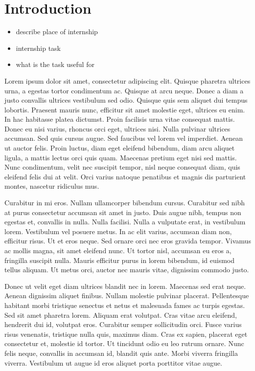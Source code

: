 \documentclass[../00_main.tex]{subfiles}
\begin{document}
\section{Introduction}

\begin{itemize}
    \item describe place of internship
    \item internship task
    \item what is the task useful for
\end{itemize}

Lorem ipsum dolor sit amet, consectetur adipiscing elit. Quisque pharetra ultrices urna, a egestas tortor condimentum ac. Quisque at arcu neque. Donec a diam a justo convallis ultrices vestibulum sed odio. Quisque quis sem aliquet dui tempus lobortis. Praesent mauris nunc, efficitur sit amet molestie eget, ultrices eu enim. In hac habitasse platea dictumst. Proin facilisis urna vitae consequat mattis. Donec eu nisi varius, rhoncus orci eget, ultrices nisi. Nulla pulvinar ultrices accumsan. Sed quis cursus augue. Sed faucibus vel lorem vel imperdiet. Aenean ut auctor felis. Proin luctus, diam eget eleifend bibendum, diam arcu aliquet ligula, a mattis lectus orci quis quam. Maecenas pretium eget nisi sed mattis. Nunc condimentum, velit nec suscipit tempor, nisl neque consequat diam, quis eleifend felis dui at velit. Orci varius natoque penatibus et magnis dis parturient montes, nascetur ridiculus mus.

Curabitur in mi eros. Nullam ullamcorper bibendum cursus. Curabitur sed nibh at purus consectetur accumsan sit amet in justo. Duis augue nibh, tempus non egestas et, convallis in nulla. Nulla facilisi. Nulla a vulputate erat, in vestibulum lorem. Vestibulum vel posuere metus. In ac elit varius, accumsan diam non, efficitur risus. Ut et eros neque. Sed ornare orci nec eros gravida tempor. Vivamus ac mollis magna, sit amet eleifend nunc. Ut tortor nisl, accumsan eu eros a, fringilla suscipit nulla. Mauris efficitur purus in lorem bibendum, id euismod tellus aliquam. Ut metus orci, auctor nec mauris vitae, dignissim commodo justo.

Donec ut velit eget diam ultrices blandit nec in lorem. Maecenas sed erat neque. Aenean dignissim aliquet finibus. Nullam molestie pulvinar placerat. Pellentesque habitant morbi tristique senectus et netus et malesuada fames ac turpis egestas. Sed sit amet pharetra lorem. Aliquam erat volutpat. Cras vitae arcu eleifend, hendrerit dui id, volutpat eros. Curabitur semper sollicitudin orci. Fusce varius risus venenatis, tristique nulla quis, maximus diam. Cras ex sapien, placerat eget consectetur et, molestie id tortor. Ut tincidunt odio eu leo rutrum ornare. Nunc felis neque, convallis in accumsan id, blandit quis ante. Morbi viverra fringilla viverra. Vestibulum ut augue id eros aliquet porta porttitor vitae augue.
\end{document}

